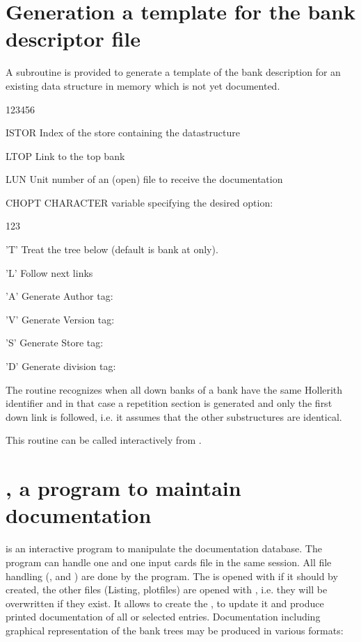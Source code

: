 \section{Generation a template for the bank descriptor file}
\label{sec:dzdocdzdtmp}  
 
A subroutine is provided to generate a template of the bank
description for an existing
data structure in memory which is not yet documented.
 
 
\Idesc
\begin{DLtt}{123456}
\item[ISTOR] Index of the store containing the datastructure
\item[LTOP]  Link to the top bank
\item[LUN]   Unit number of an (open) file to receive the documentation
\item[CHOPT] CHARACTER variable specifying the desired option:
\begin{DLtt}{123}
\item['T'] Treat the tree below  
           (default is bank at  only).
\item['L'] Follow next links
\item['A'] Generate Author tag: 
\item['V'] Generate Version tag: 
\item['S'] Generate Store tag:   
\item['D'] Generate division tag: 
\end{DLtt} 
\end{DLtt} 
 
The routine recognizes when all down banks of a bank have the same
Hollerith identifier and in that case a repetition section is generated
and only the first down link is followed, i.e. it assumes that
the other substructures are identical.
 
This routine can be called interactively from .
 

\section[{\tt DZEDIT}, a program to maintain documentation]%
        {, a program to maintain documentation}
\label{sec:dzdocdzedit}  
 
 is an interactive program to manipulate the documentation
database.
The program can handle one \RZfile{} and one input
cards file in the same session. 
All file handling (,  and ) 
are done by the program. 
The \RZfile{} is opened with  
if it should by created, the other files
(Listing, plotfiles) are opened with ,
i.e. they will be overwritten if they exist.
It allows to create the \RZfile,  to update it and
produce printed documentation of all or selected entries.
Documentation including graphical representation of the bank trees
may be produced in various formats:
 
